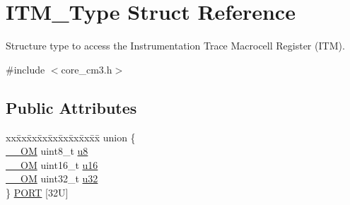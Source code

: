 \hypertarget{struct_i_t_m___type}{}\section{I\+T\+M\+\_\+\+Type Struct Reference}
\label{struct_i_t_m___type}


Structure type to access the Instrumentation Trace Macrocell Register (I\+TM).  




{\ttfamily \#include $<$core\+\_\+cm3.\+h$>$}

\subsection*{Public Attributes}
\begin{DoxyCompactItemize}
\item 
\begin{tabbing}
xx\=xx\=xx\=xx\=xx\=xx\=xx\=xx\=xx\=\kill
union \{\\
\>\hyperlink{core__sc300_8h_a0ea2009ed8fd9ef35b48708280fdb758}{\_\_OM} uint8\_t \hyperlink{struct_i_t_m___type_ae773bf9f9dac64e6c28b14aa39f74275}{u8}\\
\>\hyperlink{core__sc300_8h_a0ea2009ed8fd9ef35b48708280fdb758}{\_\_OM} uint16\_t \hyperlink{struct_i_t_m___type_a962a970dfd286cad7f8a8577e87d4ad3}{u16}\\
\>\hyperlink{core__sc300_8h_a0ea2009ed8fd9ef35b48708280fdb758}{\_\_OM} uint32\_t \hyperlink{struct_i_t_m___type_a5834885903a557674f078f3b71fa8bc8}{u32}\\
\} \hyperlink{struct_i_t_m___type_ad14bee8adf4bcc5807610d664432350e}{PORT} \mbox{[}32U\mbox{]}\\


\end{tabbing}
\end{DoxyCompactItemize}
